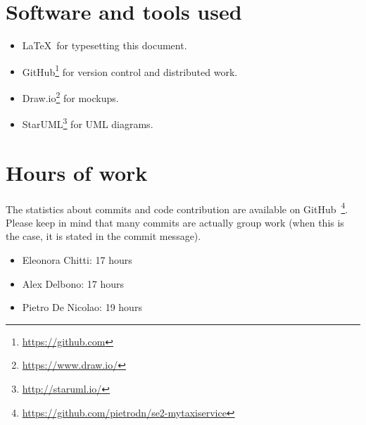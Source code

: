 \section{Software and tools used}
\begin{itemize}
    \item \LaTeX\, for typesetting this document.
    \item GitHub\footnote{\url{https://github.com}} for version control and distributed work.
    \item Draw.io\footnote{\url{https://www.draw.io/}} for mockups.
    \item StarUML\footnote{\url{http://staruml.io/}} for UML diagrams.
\end{itemize}

\section{Hours of work}
The statistics about commits and code contribution are available on GitHub~\footnote{\url{https://github.com/pietrodn/se2-mytaxiservice}}.
Please keep in mind that many commits are actually group work (when this is the case, it is stated in the commit message).

\begin{itemize}
    \item Eleonora Chitti: 17 hours
    \item Alex Delbono: 17 hours
    \item Pietro De Nicolao: 19 hours
\end{itemize}
